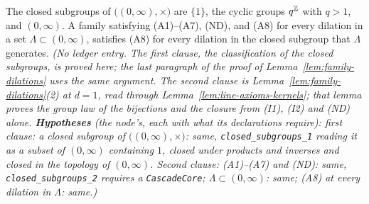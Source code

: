 \begin{lemma}
\label{lem:closed-subgroups}
\leanok
{}
The closed subgroups of $\bigl((0,\infty), \times\bigr)$ are $\{1\}$, the cyclic groups
$q^{\mathbb{Z}}$ with $q > 1$, and $(0,\infty)$. A family satisfying (A1)--(A7), (ND), and (A8) for
every dilation in a set $\Lambda \subset (0,\infty)$, satisfies (A8) for every dilation in the
closed subgroup that $\Lambda$ generates.
\statusT\quad\emph{(No ledger entry. The first clause, the classification of the closed
subgroups, is proved here; the last paragraph of the proof of Lemma~\ref{lem:family-dilations}
uses the same argument. The second clause is Lemma~\ref{lem:family-dilations}(2) at $d = 1$,
read through Lemma~\ref{lem:line-axioms-kernels}; that lemma proves the group law of the
bijections and the closure from (I1), (I2) and (ND) alone. \textbf{Hypotheses} (the node's,
each with what its declarations require): first clause: a closed subgroup of
$\bigl((0,\infty),\times\bigr)$: same, \texttt{closed\_subgroups\_1} reading it as a subset of
$(0,\infty)$ containing $1$, closed under products and inverses and closed in the topology of
$(0,\infty)$. Second clause: (A1)--(A7) and (ND): same, \texttt{closed\_subgroups\_2} requires a
\texttt{CascadeCore}; $\Lambda \subset (0,\infty)$: same; (A8) at every dilation in $\Lambda$:
same.)}
\end{lemma}

